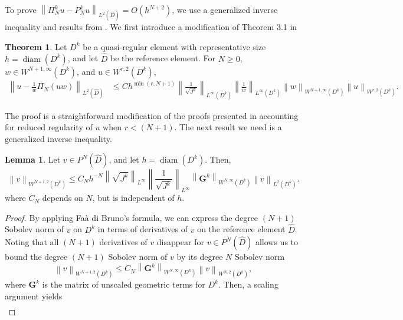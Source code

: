 \documentclass[preprint,10pt]{article}
\theoremstyle{definition}
\theoremstyle{lemma}
\newtheorem{lemma}{Lemma}
\theoremstyle{theorem}
\newtheorem{theorem}{Theorem}
\theoremstyle{assumption}
\DeclareMathOperator{\diam}{diam}
\renewcommand{\hat}{\widehat}
\newcommand{\nor}[1]{\left\| #1 \right\|}
\newcommand{\LRp}[1]{\left( #1 \right)}
\begin{document}
{To prove $\nor{\Pi_N^k u - P_N^k  u}_{L^2\LRp{\hat{D}}} = O(h^{N+2})$, we use a generalized inverse inequality and results from \cite{chan2016weight1,chan2016weight2}.  We first introduce a modification of Theorem 3.1 in \cite{warburton2013low, chan2016weight1}
\begin{theorem}%
Let $D^k$ be a quasi-regular element with representative size $h = \diam\LRp{D^k}$, and let $\hat{D}$ be the reference element.  For $N \geq 0$, $w\in W^{N+1,\infty}\LRp{D^k}$, and $u\in W^{r,2}\LRp{D^k}$, 
\begin{align*}
\nor{u - \frac{1}{w} \Pi_N\LRp{{u}{w}}}_{L^2\LRp{\hat{D}}} &\leq C h^{\min\LRp{r,N+1}} \nor{\frac{1}{\sqrt{J^k}}}_{L^{\infty}\LRp{D^k}}\nor{\frac{1}{w}}_{L^{\infty}\LRp{D^k}} \nor{w}_{W^{N+1,\infty}\LRp{D^k}} \nor{u}_{W^{r,2}\LRp{D^k}}.
\end{align*}
\label{thm:wproj}
\end{theorem}
The proof is a straightforward modification of the proofs presented in \cite{warburton2013low, chan2016weight1} accounting for reduced regularity of $u$ when $r < (N+1)$.  The next result we need is a generalized inverse inequality.  
\begin{lemma}
\label{lemma:sobolev}
Let $v \in P^N\LRp{\hat{D}}$, and let $h = \diam\LRp{D^k}$.  Then,
\[
\nor{v}_{W^{N+1,2}\LRp{D^k}} \leq C_{N}  h^{-N} \nor{\sqrt{J^k}}_{L^{\infty}} \nor{\frac{1}{\sqrt{J^k}}}_{L^{\infty}} \nor{\bm{G}^k}_{W^{N,\infty}\LRp{D^k}} \nor{v}_{L^2\LRp{D^k}}.
\]
where $C_{N}$ depends on $N$, but is independent of $h$.
\end{lemma}
\begin{proof}
  By applying Fa\`{a} di Bruno's formula, we can express the degree $(N+1)$ Sobolev norm of $v$ on $D^k$ in terms of derivatives of $v$ on the reference element $\hat{D}$.  Noting that all $(N+1)$ derivatives of $v$ disappear for $v\in P^N\LRp{\hat{D}}$ allows us to bound the degree $(N+1)$ Sobolev norm of $v$ by its degree $N$ Sobolev norm
\[
\nor{v}_{W^{N+1,2}\LRp{D^k}} \leq C_N \nor{\bm{G}^k}_{W^{N,\infty}\LRp{D^k}} \nor{v}_{W^{N,2}\LRp{D^k}},
\]
where $\bm{G}^k$ is the matrix of unscaled geometric terms for $D^k$.  Then, a scaling argument \cite{brenner2007mathematical} yields
\begin{align}

\end{align}
\end{proof}}
\end{document}
